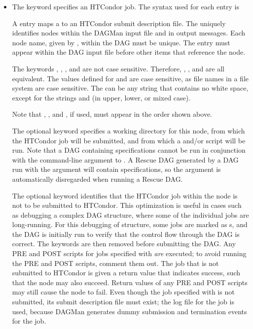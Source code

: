 \begin{itemize}

\label{dagman:JOB}
\item {}

The  keyword specifies an HTCondor job.
The syntax used for each  entry is

  
  

A  entry maps a  to an HTCondor submit description file.
The  uniquely identifies nodes within the
DAGMan input file and in output messages.
Each node name, given by , within the DAG must be unique.
The  entry must appear within the DAG input file before
other items that reference the node.

The keywords , , , and 
are not case sensitive.
Therefore, , , and  are all equivalent.
The values defined for  and 
are case sensitive, as file names 
in a file system are case sensitive.
The  can be any string that contains no white space, except
for the strings  and  (in upper, lower, or mixed
case).

Note that , , and , if used, must appear
in the order shown above.

The optional  keyword specifies a working directory
for this node,
from which the HTCondor job will be submitted,
and from which a  and/or
 script will be run.
Note that a DAG containing  specifications cannot
be run in conjunction with the  command-line
argument to .  A Rescue DAG generated by
a DAG run with the  argument will contain
 specifications, so the  argument is
automatically disregarded when running a Rescue DAG.

\label{dagman:NOOP}
The optional  keyword identifies that the HTCondor job within
the node is not to be submitted to HTCondor.
This optimization is useful in cases such as debugging a complex DAG structure,
where some of the individual jobs are long-running.
For this debugging of structure,
some jobs are marked as s, and
the DAG is initially run to verify that the control flow through
the DAG is correct.
The  keywords are then removed before submitting the DAG.
Any PRE and POST scripts
for jobs specified with  \emph{are} executed;
to avoid running the PRE and POST scripts, comment them out.
The job that is not submitted to HTCondor is given a return value that indicates
success, such that the node may also succeed.
Return values of any 
PRE and POST scripts may still cause the node to fail.
Even though the job specified with  is not submitted,
its submit description file must exist;
the log file for the job is used, 
because DAGMan generates dummy submission and termination events for the job.


\end{itemize}
